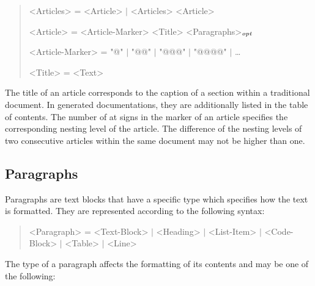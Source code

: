 \begin{quote}\begin{grammar}
<Articles> = <Article> $\mid$ <Articles> <Article> \par
<Article> = <Article-Marker> <Title> <Paragraphs>$_\mathit{opt}$ \par
<Article-Marker> = "@" $\mid$ "@@" $\mid$ "@@@" $\mid$ "@@@@" $\mid$ \ldots \par
<Title> = <Text> \par
\end{grammar}\end{quote}

The title of an article corresponds to the caption of a section within a traditional document.
In generated documentations, they are additionally listed in the table of contents.
The number of at signs in the marker of an article specifies the corresponding nesting level of the article.
The difference of the nesting levels of two consecutive articles within the same document may not be higher than one.

\subsection{Paragraphs}

Paragraphs are text blocks that have a specific type which specifies how the text is formatted.
They are represented according to the following syntax:

\begin{quote}\begin{grammar}
<Paragraph> = <Text-Block> $\mid$ <Heading> $\mid$ <List-Item> $\mid$ <Code-Block> $\mid$ <Table> $\mid$ <Line> \par
\end{grammar}\end{quote}

The type of a paragraph affects the formatting of its contents and may be one of the following:

